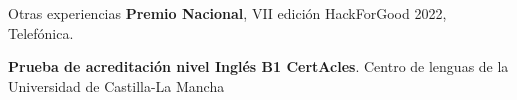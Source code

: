 \begin{rubric}{ Otras experiencias}
\entry*[2023] \textbf{Premio Nacional}, VII edición HackForGood 2022, Telefónica.
%

\entry*[2022] \textbf{Prueba de acreditación nivel Inglés B1 CertAcles}. Centro de lenguas de la Universidad de Castilla-La Mancha
\end{rubric}